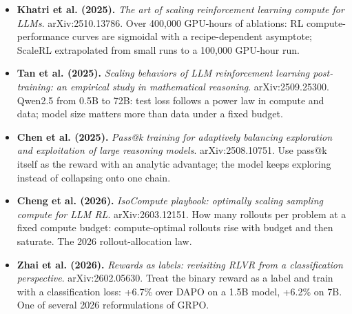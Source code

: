 \documentclass[11pt,letterpaper]{article}
\begin{document}
\begin{itemize}[leftmargin=1.2em,itemsep=3pt]
\item \textbf{Khatri et al. (2025).} \textit{The art of scaling reinforcement learning compute for LLMs}. arXiv:2510.13786. Over 400,000 GPU-hours of ablations: RL compute-performance curves are sigmoidal with a recipe-dependent asymptote; ScaleRL extrapolated from small runs to a 100,000 GPU-hour run.
\item \textbf{Tan et al. (2025).} \textit{Scaling behaviors of LLM reinforcement learning post-training: an empirical study in mathematical reasoning}. arXiv:2509.25300. Qwen2.5 from 0.5B to 72B: test loss follows a power law in compute and data; model size matters more than data under a fixed budget.
\item \textbf{Chen et al. (2025).} \textit{Pass@k training for adaptively balancing exploration and exploitation of large reasoning models}. arXiv:2508.10751. Use pass@k itself as the reward with an analytic advantage; the model keeps exploring instead of collapsing onto one chain.
\item \textbf{Cheng et al. (2026).} \textit{IsoCompute playbook: optimally scaling sampling compute for LLM RL}. arXiv:2603.12151. How many rollouts per problem at a fixed compute budget: compute-optimal rollouts rise with budget and then saturate. The 2026 rollout-allocation law.
\item \textbf{Zhai et al. (2026).} \textit{Rewards as labels: revisiting RLVR from a classification perspective}. arXiv:2602.05630. Treat the binary reward as a label and train with a classification loss: +6.7\% over DAPO on a 1.5B model, +6.2\% on 7B. One of several 2026 reformulations of GRPO.
\end{itemize}
\end{document}
